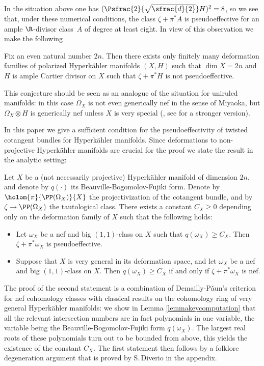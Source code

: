 In the situation above one has $(\Psfrac{2}{\sqrt{\sfrac{d}{2}}}H)^2 = 8$, so we see that, under these numerical conditions, the class $\zeta+\pi^* A$
is pseudoeffective for an ample $\R$-divisor class~$A$ of degree at least eight.
In view of this observation we make the following

\begin{conjecture} \label{conjecturegeneral}
Fix an even natural number $2n$. Then there exists only
finitely many deformation families of polarized Hyperkähler manifolds $(X, H)$ such that $\dim X=2n$ and
$H$ is ample Cartier divisor on $X$ such that $\zeta + \pi^* H$ is not pseudoeffective.
\end{conjecture}

This conjecture should be seen as an analogue of the situation for uniruled manifolds: in this case $\Omega_X$
is not even generically nef in the sense of Miyaoka, but $\Omega_X \otimes H$ is
generically nef unless $X$ is very special (\cite[Th.\,1.1]{Hoe14}, see \cite[Cor.\,1.3]{AD17} for a stronger version).

In this paper we give a sufficient condition for the pseudoeffectivity of twisted cotangent bundles
for Hyperkähler manifolds. Since deformations to non-projective Hyperkähler manifolds
are crucial for the proof we state the result in the analytic setting:

\begin{theorem}\label{theoremmain}
Let $X$ be a (not necessarily projective) Hyperkähler manifold of dimension $2n$,
and denote by $q(\cdot)$ its Beauville-Bogomolov-Fujiki form.
Denote by $\holom{\pi}{\PP(\Omega_X)}{X}$ the projectivization of the cotangent bundle, and by $\zeta \to \PP(\Omega_X)$ the tautological class.
There exists a constant $C_X \geq 0$ depending only on the deformation family of $X$ such that
the following holds:
\begin{itemize}
\item Let $\omega_X$ be a nef and big $(1,1)$-class on $X$ such that $q(\omega_X) \geq C_X$.
Then $\zeta+\pi^*\omega_X$ is pseudoeffective.
\item Suppose that $X$ is very general in its deformation space, and let
$\omega_X$ be a nef and big $(1,1)$-class on $X$.
Then $q(\omega_X) \geq C_X$ if and only if $\zeta+\pi^*\omega_X$ is nef.
\end{itemize}
\end{theorem}

The proof of the second statement is a combination of Demailly-P\v aun's criterion for nef cohomology classes with
classical results on the cohomology ring of very general Hyperkähler manifolds: we show in Lemma \ref{lemmakeycomputation} that all the relevant intersection numbers are in fact polynomials in one variable,
the variable being the Beauville-Bogomolov-Fujiki form $q(\omega_X)$. The largest real roots of these polynomials turn out to be bounded from above, this yields the existence of the constant $C_X$. The first statement then follows by a folklore
degeneration argument that is proved by S.\,Diverio in the appendix.


